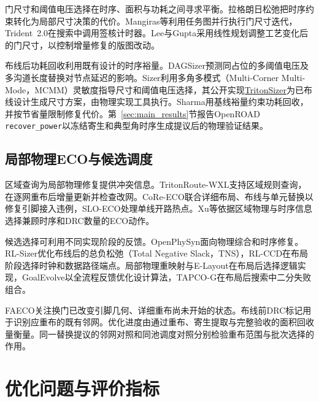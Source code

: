 \documentclass[twocolumn,10pt,fontset=windows]{ctexart}
\begin{document}
门尺寸和阈值电压选择在时序、面积与功耗之间寻求平衡\cite{ozdal2012ispd,hu2013ispd}。拉格朗日松弛把时序约束转化为局部尺寸决策的代价\cite{chen1999fast,flach2014effective}。Mangiras等\cite{timing_budget}利用任务图并行执行门尺寸迭代，Trident~2.0\cite{trident2}在搜索中调用签核计时器。Lee与Gupta\cite{lee2012eco}采用线性规划调整工艺变化后的门尺寸，以控制增量修复的版图改动。

布线后功耗回收利用既有设计的时序裕量。DAGSizer\cite{cheng2023dagsizer}预测同占位的多阈值电压及多沟道长度替换对节点延迟的影响。Sizer\cite{fatemi2019sizer}利用多角多模式（Multi-Corner Multi-Mode，MCMM）灵敏度指导尺寸和阈值电压选择，其公开实现\href{https://github.com/The-OpenROAD-Project/TritonSizer}{TritonSizer}为已布线设计生成尺寸方案，由物理实现工具执行。Sharma\cite{sharma2026power}用基线裕量约束功耗回收，并按节省量限制修复代价。第~\ref{sec:main_results}节报告OpenROAD \texttt{recover\_power}\cite{openroad}以冻结寄生和典型角时序生成提议后的物理验证结果。

\subsection{局部物理ECO与候选调度}

区域查询为局部物理修复提供冲突信息。TritonRoute-WXL\cite{tritonroutewxl}支持区域规则查询，在逐网重布后增量更新并检查改网。CoRe-ECO\cite{coreeco}联合详细布局、布线与单元替换以修复引脚接入违例，SLO-ECO\cite{sloeco2024}处理单线开路热点。Xu等\cite{xu2026eco}依据区域物理与时序信息选择兼顾时序和DRC数量的ECO动作。

候选选择可利用不同实现阶段的反馈。OpenPhySyn\cite{openphysyn2020}面向物理综合和时序修复。RL-Sizer\cite{rlsizer2021}优化布线后的总负松弛（Total Negative Slack，TNS），RL-CCD\cite{rlccd2023}在布局阶段选择时钟和数据路径端点。局部物理重映射\cite{pcr2026}与E-Layout\cite{elayout2026}在布局后选择逻辑实现，GoalEvolve\cite{goalevolve2026}以全流程反馈优化设计算法，TAPCO-G\cite{tapcog2026}在布局后搜索中二分失败组合。

FAECO关注换门已改变引脚几何、详细重布尚未开始的状态。布线前DRC标记用于识别应重布的既有邻网。优化进度由通过重布、寄生提取与完整验收的面积回收量衡量。同一替换提议的邻网对照和同池调度对照分别检验重布范围与批次选择的作用。

\section{优化问题与评价指标}
\end{document}
